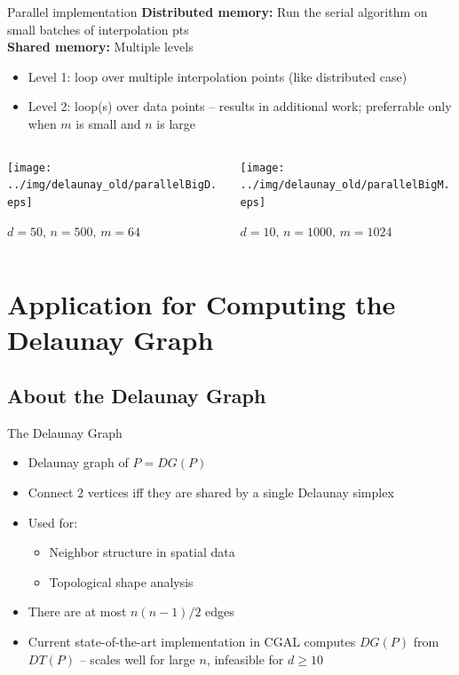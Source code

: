 \documentclass[aspectratio=169]{beamer}
\begin{document}
\begin{frame}{Parallel implementation}
\textbf{Distributed memory:} Run
the serial algorithm on small batches of interpolation pts\\
\medskip
{\bf Shared memory:} Multiple levels
\begin{itemize}
\item Level 1: loop over multiple interpolation points (like distributed case)
\item Level 2: loop(s) over data points -- results in additional work;
preferrable only when $m$ is small and $n$ is large
\end{itemize}
\begin{columns}
\begin{column}{.5\textwidth}
\texttt{[image: ../img/delaunay\_old/parallelBigD.eps]}
\begin{center}$d=50\text{, }n=500\text{, }m=64$\end{center}
\end{column}
\begin{column}{.5\textwidth}
\texttt{[image: ../img/delaunay\_old/parallelBigM.eps]}
\begin{center}$d=10\text{, }n=1000\text{, }m=1024$\end{center}
\end{column}
\end{columns}
\end{frame}

\section{Application for Computing the Delaunay Graph}
\subsection{About the Delaunay Graph}
\begin{frame}{The Delaunay Graph}
\begin{itemize}
\item Delaunay graph of $P = DG(P)$
\item Connect 2 vertices iff they are shared by a single Delaunay simplex
\item Used for:
\begin{itemize}
\item Neighbor structure in spatial data
\item Topological shape analysis
\end{itemize}
\item There are at most $n(n-1)/2$ edges
\item Current state-of-the-art implementation in CGAL computes $DG(P)$ from
$DT(P)$ -- scales well for large $n$, infeasible for $d\geq10$
\end{itemize}
\end{frame}
\end{document}

